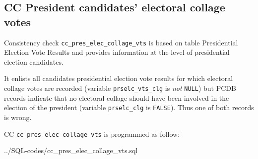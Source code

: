 \subsection{CC President candidates' electoral collage votes}\label{cc_pres_elec_collage_vts}
Consistency check \texttt{\footnotesize cc\_pres\_elec\_collage\_vts} is based on table Presidential Election Vote Results and provides information at the level of presidential election candidates. 

It enlists all candidates presidential election vote results for which electoral collage votes are recorded (variable \texttt{\footnotesize prselc\_vts\_clg} is \emph{not} \texttt{\footnotesize NULL}) but PCDB records indicate that no electoral collage should have been involved in the election of the president (variable \texttt{\footnotesize prselc\_clg} is \texttt{\footnotesize FALSE}). Thus one of both records is wrong.


CC \texttt{\footnotesize cc\_pres\_elec\_collage\_vts} is programmed as follow: 

%
{../SQL-codes/cc_pres_elec_collage_vts.sql}

